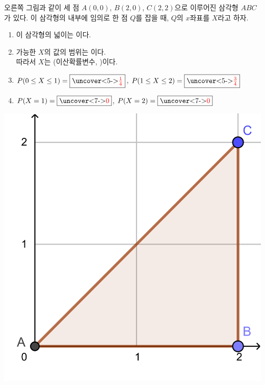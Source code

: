 \documentclass[t,8pt]{beamer}
\newcounter{num}
\newcommand{\rb}[2]%
{\fbox{\uncover<#1>{\red{\ensuremath{#2}}}}}
\newcommand{\red}[1]{\color{red}{#1}}
\begin{document}
\begin{frame}[t]{\subsecname}
오른쪽 그림과 같이 세 점 \(A(0,0)\), \(B(2,0)\), \(C(2,2)\)으로 이루어진 삼각형 \(ABC\)가 있다.
이 삼각형의 내부에 임의로 한 점 \(Q\)를 잡을 때, \(Q\)의 \(x\)좌표를 \(X\)라고 하자.
\begin{minipage}{.66\textwidth}
\begin{enumerate}[(1)]
\item
이 삼각형의 넓이는 \rb{2-}{2}이다.
\item<2->
가능한 \(X\)의 값의 범위는 \rb{3-}{0\le X\le 2}이다.\\[5pt]
따라서 \(X\)는 (이산확률변수, {})이다.
\item<4->
\(P(0\le X\le1)=\rb{5-}{\frac14}\),\qquad
\(P(1\le X\le2)=\rb{5-}{\frac34}\)
\item<6->
\(P(X=1)=\rb{7-}0\),\qquad
\(P(X=2)=\rb{7-}0\)
\end{enumerate}
\par\bigskip
{}
\end{minipage}
\begin{minipage}{.3\textwidth}
\includegraphics[width=.9\textwidth]{img/2-1-1}

\end{minipage}
\end{frame}
\end{document}

